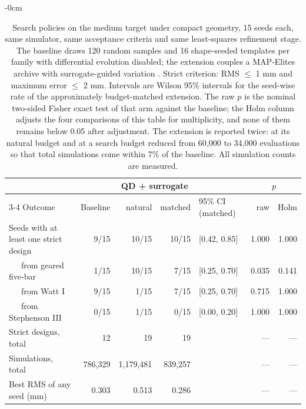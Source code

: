 \begin{table}[H]
\caption{Search policies on the medium target under compact geometry, 15 seeds each, same simulator, same acceptance criteria and same least-squares refinement stage. The baseline draws 120 random samples and 16 shape-seeded templates per family with differential evolution disabled; the extension couples a MAP-Elites archive with surrogate-guided variation \cite{Kent2025,Khaldi2023}. Strict criterion: RMS $\leq$ 1 mm and maximum error $\leq$ 2 mm. Intervals are Wilson 95\% intervals \cite{Wilson1927} for the seed-wise rate of the approximately budget-matched extension. The raw $p$ is the nominal two-sided Fisher exact test of that arm against the baseline; the Holm column adjusts the four comparisons of this table for multiplicity, and none of them remains below 0.05 after adjustment. The extension is reported twice: at its natural budget and at a search budget reduced from 60{,}000 to 34{,}000 evaluations so that total simulations come within 7\% of the baseline. All simulation counts are measured.}
\label{tab:qd_extension}
\begin{adjustwidth}{-\extralength}{0cm}
\centering
\small
\setlength{\tabcolsep}{4pt}
\begin{tabular}{p{5cm}rrrlrr}
\hline
& & \multicolumn{2}{c}{QD + surrogate} & & \multicolumn{2}{c}{$p$} \\
\cline{3-4} \cline{6-7}
Outcome & Baseline & natural & matched & 95\% CI (matched) & raw & Holm \\
\hline
Seeds with at least one strict design & 9/15 & 10/15 & 10/15 & [0.42, 0.85] & 1.000 & 1.000 \\
~~~from geared five-bar & 1/15 & 10/15 & 7/15 & [0.25, 0.70] & 0.035 & 0.141 \\
~~~from Watt I & 9/15 & 1/15 & 7/15 & [0.25, 0.70] & 0.715 & 1.000 \\
~~~from Stephenson III & 0/15 & 1/15 & 0/15 & [0.00, 0.20] & 1.000 & 1.000 \\
\hline
Strict designs, total & 12 & 19 & 19 & & --- & --- \\
Simulations, total & 786{,}329 & 1{,}179{,}481 & 839{,}257 & & --- & --- \\
Best RMS of any seed (mm) & 0.303 & 0.513 & 0.286 & & --- & --- \\
\hline
\end{tabular}
\end{adjustwidth}
\end{table}
